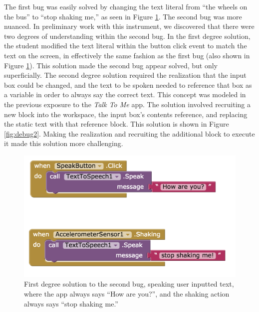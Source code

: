 The first bug was easily solved by changing the text literal from ``the wheels on the bus'' to ``stop shaking me,'' as seen in Figure \ref{fig:debug1}. The second bug was more nuanced. In preliminary work with this instrument, we discovered that there were two degrees of understanding within the second bug. In the first degree solution, the student modified the text literal within the button click event to match the text on the screen, in effectively the same fashion as the first bug (also shown in Figure \ref{fig:debug1}). This solution made the second bug appear solved, but only superficially. The second degree solution required the realization that the input box could be changed, and the text to be spoken needed to reference that box as a variable in order to always say the correct text. This concept was modeled in the previous exposure to the \emph{Talk To Me} app. The solution involved recruiting a new block into the workspace, the input box's contents reference, and replacing the static text with that reference block. This solution is shown in Figure \ref{fig:debug2}. Making the realization and recruiting the additional block to execute it made this solution more challenging.

\begin{figure}
  \centering
      \includegraphics[width=\textwidth]{images/debugActivity/debug1shaking}
  \caption[First Degree Solutions to the Second Bug]{First degree solution to the second bug, speaking user inputted text, where the app always says ``How are you?'', and the shaking action always says ``stop shaking me.''}
  \label{fig:debug1}
\end{figure}

